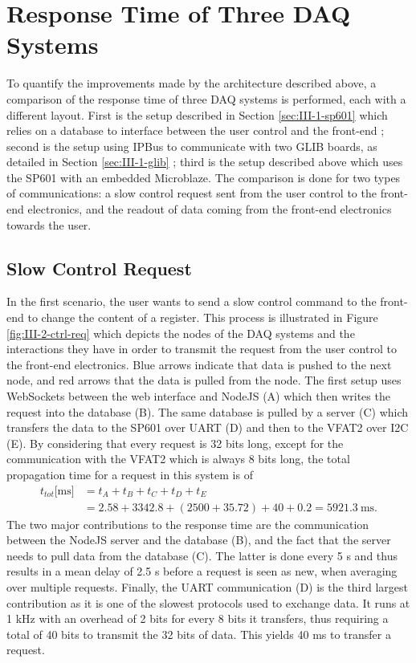   \section{Response Time of Three DAQ Systems}

    To quantify the improvements made by the architecture described above, a comparison of the response time of three DAQ systems is performed, each with a different layout. First is the setup described in Section \ref{sec:III-1-sp601} which relies on a database to interface between the user control and the front-end ; second is the setup using IPBus to communicate with two GLIB boards, as detailed in Section \ref{sec:III-1-glib} ; third is the setup described above which uses the SP601 with an embedded Microblaze. The comparison is done for two types of communications: a slow control request sent from the user control to the front-end electronics, and the readout of data coming from the front-end electronics towards the user.

    \subsection{Slow Control Request}

      In the first scenario, the user wants to send a slow control command to the front-end to change the content of a register. This process is illustrated in Figure \ref{fig:III-2-ctrl-req} which depicts the nodes of the DAQ systems and the interactions they have in order to transmit the request from the user control to the front-end electronics. Blue arrows indicate that data is pushed to the next node, and red arrows that the data is pulled from the node. The first setup uses WebSockets between the web interface and NodeJS (A) which then writes the request into the database (B). The same database is pulled by a server (C) which transfers the data to the SP601 over UART (D) and then to the VFAT2 over I2C (E). By considering that every request is 32 bits long, except for the communication with the VFAT2 which is always 8 bits long, the total propagation time for a request in this system is of
      \begin{equation}
        \begin{split}
          t_{tot}\text{[ms]} & = t_A + t_B + t_C + t_D + t_E \\
                             & = 2.58 + 3342.8 + (2500 + 35.72) + 40 + 0.2 = 5921.3 \ \text{ms}.
        \end{split}
      \end{equation}
      The two major contributions to the response time are the communication between the NodeJS server and the database (B), and the fact that the server needs to pull data from the database (C). The latter is done every 5 s and thus results in a mean delay of 2.5 s before a request is seen as new, when averaging over multiple requests. Finally, the UART communication (D) is the third largest contribution as it is one of the slowest protocols used to exchange data. It runs at 1 kHz with an overhead of 2 bits for every 8 bits it transfers, thus requiring a total of 40 bits to transmit the 32 bits of data. This yields 40 ms to transfer a request. \\

